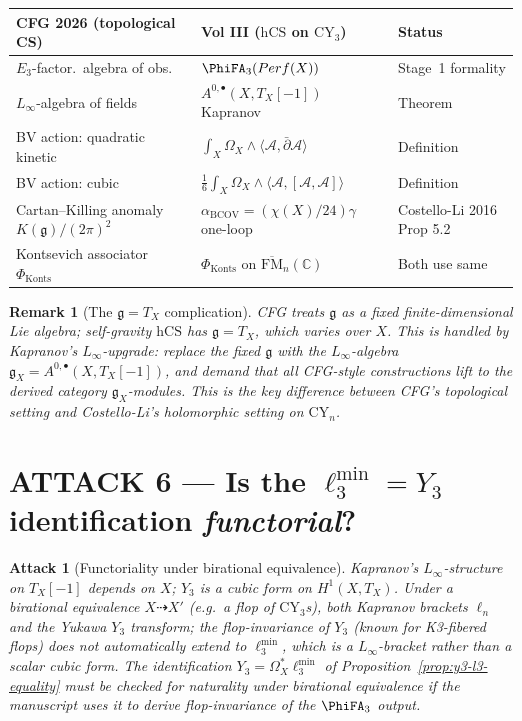 \documentclass[11pt]{article}
\newtheorem{remark}[theorem]{Remark}
\newtheorem{attack}[theorem]{Attack}
\providecommand{\CY}{\mathrm{CY}}
\providecommand{\BCOV}{\mathrm{BCOV}}
\providecommand{\hCS}{\mathrm{hCS}}
\providecommand{\Perf}{\mathrm{Perf}}
\providecommand{\Om}{\Omega}
\providecommand{\cA}{\mathcal{A}}
\providecommand{\fg}{\mathfrak{g}}
\providecommand{\CC}{\mathbb{C}}
\providecommand{\FM}{\overline{\mathrm{FM}}}
\begin{document}
\begin{center}
\begin{tabular}{lll}
CFG 2026 (topological CS) & Vol III ($\hCS$ on $\CY_3$) & Status \\
\hline
$E_3$-factor.\ algebra of obs.\ & $\PhiFA_3(\Perf(X))$ & Stage~1 formality \\
$L_\infty$-algebra of fields & $A^{0,\bullet}(X, T_X[-1])$ Kapranov & Theorem \\
BV action: quadratic kinetic & $\int_X \Om_X \wedge \langle \cA, \bar\partial
  \cA \rangle$ & Definition \\
BV action: cubic & $\frac{1}{6} \int_X \Om_X \wedge \langle \cA,
  [\cA, \cA] \rangle$ & Definition \\
Cartan--Killing anomaly $K(\fg)/(2\pi)^2$ & $\alpha_\BCOV =
  (\chi(X)/24) \gamma$ one-loop & Costello-Li 2016 Prop 5.2 \\
Kontsevich associator $\Phi_\mathrm{Konts}$ & $\Phi_\mathrm{Konts}$ on
  $\FM_n(\CC)$ & Both use same \\
\end{tabular}
\end{center}

\begin{remark}[The $\fg = T_X$ complication]
\label{rem:fg-tx-complication}
CFG treats $\fg$ as a fixed finite-dimensional Lie algebra; self-gravity
$\hCS$ has $\fg = T_X$, which varies over $X$. This is handled by
Kapranov's $L_\infty$-upgrade: replace the fixed $\fg$ with the
$L_\infty$-algebra $\mathfrak g_X = A^{0,\bullet}(X, T_X[-1])$, and
demand that all CFG-style constructions lift to the derived category
$\mathfrak g_X$-modules. This is the key difference between CFG's
topological setting and Costello-Li's holomorphic setting on $\CY_n$.
\end{remark}

\section{ATTACK 6 --- Is the $\ell_3^{\min} = Y_3$ identification
\emph{functorial}?}
\label{sec:attack-6}

\begin{attack}[Functoriality under birational equivalence]
\label{atk:6}
Kapranov's $L_\infty$-structure on $T_X[-1]$ depends on $X$; $Y_3$ is a
cubic form on $H^1(X, T_X)$. Under a birational equivalence $X \dashrightarrow
X'$ (e.g.\ a flop of $\CY_3$s), both Kapranov brackets $\ell_n$ and the
Yukawa $Y_3$ transform; the flop-invariance of $Y_3$ (known for K3-fibered
flops) does not automatically extend to $\ell_3^{\min}$, which is a
$L_\infty$-bracket rather than a scalar cubic form. The identification
$Y_3 = \Om_X^* \ell_3^{\min}$ of Proposition~\ref{prop:y3-l3-equality}
must be checked for naturality under birational equivalence if the
manuscript uses it to derive flop-invariance of the $\PhiFA_3$ output.
\end{attack}
\end{document}
